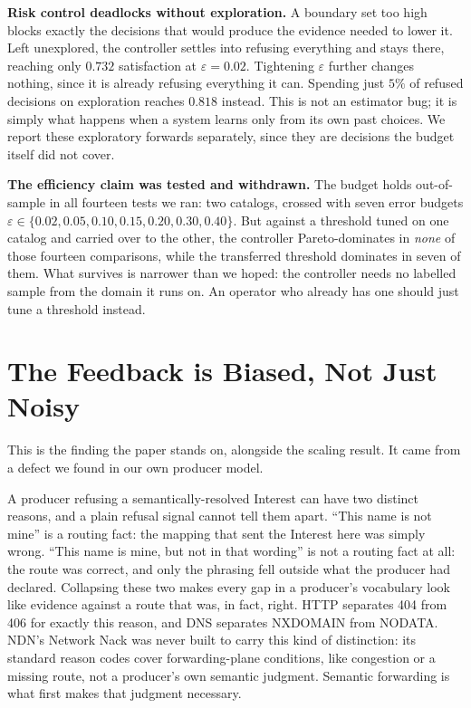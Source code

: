 \documentclass[conference]{IEEEtran}
\begin{document}
		\textbf{Risk control deadlocks without exploration.} A boundary set too
		high blocks exactly the decisions that would produce the evidence needed to
		lower it. Left unexplored, the controller settles into refusing everything
		and stays there, reaching only $0.732$ satisfaction at $\varepsilon=0.02$.
		Tightening $\varepsilon$ further changes nothing, since it is already
		refusing everything it can. Spending just $5\%$ of refused decisions on
		exploration reaches $0.818$ instead. This is not an estimator bug; it is
		simply what happens when a system learns only from its own past choices. We
		report these exploratory forwards separately, since they are decisions the
		budget itself did not cover.
		
		\textbf{The efficiency claim was tested and withdrawn.} The budget holds
		out-of-sample in all fourteen tests we ran: two catalogs, crossed with
		seven error budgets $\varepsilon \in \{0.02, 0.05, 0.10, 0.15, 0.20, 0.30,
		0.40\}$. But against a threshold tuned on one catalog and carried over to
		the other, the controller Pareto-dominates in \emph{none} of those fourteen
		comparisons, while the transferred threshold dominates in seven of them.
		What survives is narrower than we hoped: the controller needs no labelled
		sample from the domain it runs on. An operator who already has one should
		just tune a threshold instead.
		
		\section{The Feedback is Biased, Not Just Noisy}
		\label{sec:bias}
		
		This is the finding the paper stands on, alongside the scaling result. It
		came from a defect we found in our own producer model.
		
		A producer refusing a semantically-resolved Interest can have two distinct
		reasons, and a plain refusal signal cannot tell them apart. ``This name is
		not mine'' is a routing fact: the mapping that sent the Interest here was
		simply wrong. ``This name is mine, but not in that wording'' is not a
		routing fact at all: the route was correct, and only the phrasing fell
		outside what the producer had declared. Collapsing these two makes every
		gap in a producer's vocabulary look like evidence against a route that
		was, in fact, right. HTTP separates 404 from 406 for exactly this reason,
		and DNS separates NXDOMAIN from NODATA. NDN's Network Nack was never built
		to carry this kind of distinction: its standard reason codes cover
		forwarding-plane conditions, like congestion or a missing route, not a
		producer's own semantic judgment. Semantic forwarding is what first makes
		that judgment necessary.
		
\end{document}
